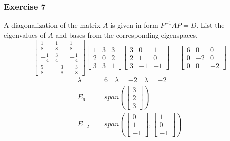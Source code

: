 \documentclass{math}
\begin{document}
\subsubsection*{Exercise 7}
A diagonalization of the matrix \( A \) is given in form \( P^{-1}AP = D \).
List the eigenvalues of \( A \) and bases from the corresponding eigenspaces.
\[ \begin{bmatrix}
    \frac{1}{8} & \frac{1}{8} & \frac{1}{8} \\[0.5em]
    -\frac{1}{4} & \frac{3}{4} & -\frac{1}{4} \\[0.5em]
    \frac{5}{8} & -\frac{3}{8} & -\frac{3}{8}
  \end{bmatrix}\begin{bmatrix}
    1 & 3 & 3 \\
    2 & 0 & 2 \\
    3 & 3 & 1
  \end{bmatrix}\begin{bmatrix}
    3 & 0 & 1 \\
    2 & 1 & 0 \\
    3 & -1 & -1
  \end{bmatrix} = \begin{bmatrix}
    6 & 0 & 0 \\
    0 & -2 & 0 \\
    0 & 0 & -2
  \end{bmatrix} \]
\begin{align*}
  \lambda &= 6 \quad \lambda = -2 \quad \lambda = -2 \\
  E_6 &= span\left(\begin{bmatrix}3 \\ 2 \\ 3\end{bmatrix}\right) \\
  E_{-2} &= span\left(\begin{bmatrix}0 \\ 1 \\ -1\end{bmatrix},
    \begin{bmatrix}1 \\ 0 \\ -1\end{bmatrix}\right)
\end{align*}
\end{document}
